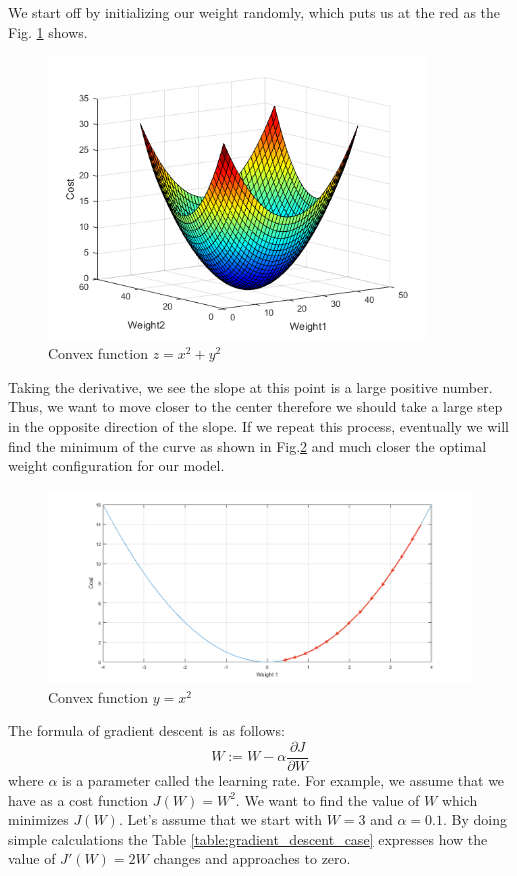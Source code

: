 We start off by initializing our weight randomly, which puts us at the red as the Fig. \ref{fig:3D_convex_function} shows.
\begin{figure}[h!]
\includegraphics[width=10cm,center,keepaspectratio]{figures/3D_convex_function}
\caption{Convex function $z = x^2 + y^2$}
\label{fig:3D_convex_function}
\end{figure}
Taking the derivative, we see the slope at this point is a large positive number. Thus, we want to move closer to the center therefore we should take a large step in the opposite direction of the slope. If we repeat this process, eventually we will find the minimum of the curve as shown in Fig.\ref{fig:2D_convex_function} and much closer the optimal weight configuration for our model.
\begin{figure}[h!]
\includegraphics[width=16cm,center,keepaspectratio]{figures/2D_convex_function}
\caption{Convex function $y = x^2$}
\label{fig:2D_convex_function}
\end{figure}
The formula of gradient descent is as follows:
\begin{equation}
W := W - \alpha \frac{\partial J}{\partial W}
\end{equation}
where $\alpha$ is a parameter called  the learning rate. For example, we assume that we have as a cost function $J(W) = W^2$. We want to find the value of $W$ which minimizes $J(W)$. Let's assume that we start with $W=3$ and $\alpha = 0.1$. By doing simple calculations the Table \ref{table:gradient_descent_case} expresses how the value of $J'(W) = 2W$ changes and approaches to zero.

